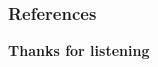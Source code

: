 \documentclass{beamer}
\begin{document}
\begin{frame}[allowframebreaks]
        \frametitle{References}
        
        
    \tiny{}
\end{frame}
\begin{frame}[focus]
    \textbf{\Huge{Thanks for listening}}
\end{frame}
\end{document}
